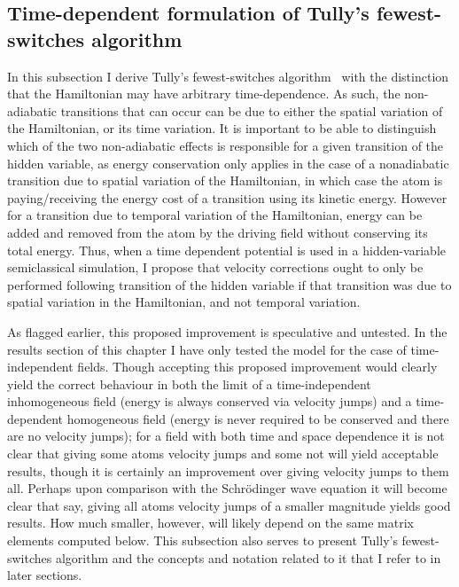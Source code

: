 \subsection{Time-dependent formulation of Tully's fewest-switches algorithm}\label{sec:fewest_switches}

In this subsection I derive Tully's fewest-switches algorithm~\cite{doi:10.1146/annurev-physchem-040215-112245, doi:10.1063/1.459170} with the distinction that the Hamiltonian may have arbitrary time-dependence. As such, the non-adiabatic transitions that can occur can be due to either the spatial variation of the Hamiltonian, or its time variation. It is important to be able to distinguish which of the two non-adiabatic effects is responsible for a given transition of the hidden variable, as energy conservation only applies in the case of a nonadiabatic transition due to spatial variation of the Hamiltonian, in which case the atom is paying/receiving the energy cost of a transition using its kinetic energy. However for a transition due to temporal variation of the Hamiltonian, energy can be added and removed from the atom by the driving field without conserving its total energy. Thus, when a time dependent potential is used in a hidden-variable semiclassical simulation, I propose that velocity corrections ought to only be performed following transition of the hidden variable if that transition was due to spatial variation in the Hamiltonian, and not temporal variation.

As flagged earlier, this proposed improvement is speculative and untested. In the results section of this chapter I have only tested the model for the case of time-independent fields. Though accepting this proposed improvement would clearly yield the correct behaviour in both the limit of a time-independent inhomogeneous field (energy is always conserved via velocity jumps) and a time-dependent homogeneous field (energy is never required to be conserved and there are no velocity jumps); for a field with both time and space dependence it is not clear that giving some atoms velocity jumps and some not will yield acceptable results, though it is certainly an improvement over giving velocity jumps to them all. Perhaps upon comparison with the Schr\"odinger wave equation it will become clear that say, giving all atoms velocity jumps of a smaller magnitude yields good results. How much smaller, however, will likely depend on the same matrix elements computed below. This subsection also serves to present Tully's fewest-switches algorithm and the concepts and notation related to it that I refer to in later sections.

